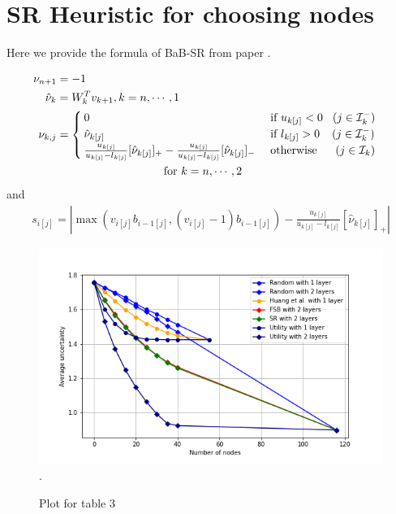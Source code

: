 \section{SR Heuristic for choosing nodes}

Here we provide the formula of BaB-SR from paper \cite{BaB}.

\begin{align*}
	\nu_{n+1} &= -1&\\
	\hat{\nu}_k &= W^T_kv_{k+1}, k = n,\cdots,1 &\\
	\nu_{k,j} &= \begin{cases}
		0  &\text{ if }u_{k[j]}<0 \hspace*{2ex}(j\in\mathcal{I}^-_k)\\
		\hat{\nu}_{k[j]} &\text{ if }l_{k[j]}>0 \hspace*{2.5ex}(j\in\mathcal{I}^-_k)\\
		\frac{u_{k[j]}}{u_{k[j]}-l_{k[j]}}[\hat{\nu}_{k[j]}]_+-\frac{u_{k[j]}}{u_{k[j]}-l_{k[j]}}[\hat{\nu}_{k[j]}]_-  &\text{ otherwise } \hspace*{3ex}(j\in\mathcal{I}_k)\\ 
	\end{cases}\\
	&\hspace*{22ex}\text{for } k = n,\cdots,2&
\end{align*}and\begin{align*}
	s_{i[j]} = |\max(v_{i[j]}b_{i-1[j]},(v_{i[j]}-1)b_{i-1[j]})-\frac{u_{k[j]}}{u_{k[j]}-l_{k[j]}}[\hat{\nu}_{k[j]}]_+|
\end{align*}


\begin{figure}[b!]
	\hspace*{-0.8cm}
	\includegraphics[scale=0.6]{Plot for table 3}.
	\caption{Plot for table 3}
	\label{fig_table3}
\end{figure}


